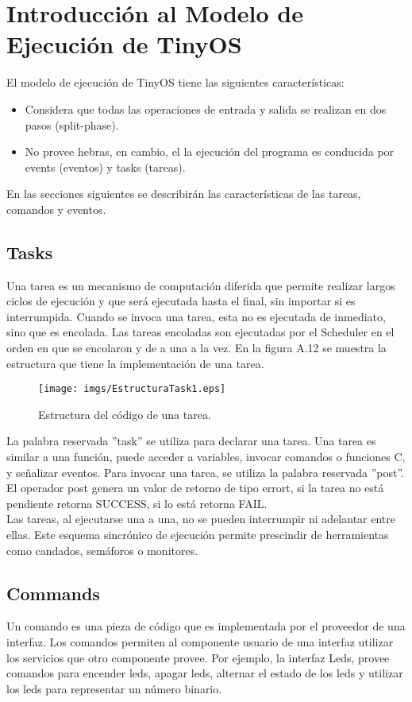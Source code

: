 \section{Introducción al Modelo de Ejecución de TinyOS}
El modelo de ejecución de TinyOS tiene las siguientes características:
\begin{itemize}
\item Considera que todas las operaciones de entrada y salida se realizan en dos pasos (split-phase).
\item No provee hebras, en cambio, el la ejecución del programa es conducida por events (eventos) y tasks  (tareas).
\end{itemize}

En las secciones siguientes se describirán las características de las tareas, comandos y eventos.

\subsection{Tasks}
Una tarea es un mecanismo de computación diferida que permite realizar largos ciclos de ejecución y que será ejecutada hasta el final, sin importar si es interrumpida. Cuando se invoca una tarea, esta no es ejecutada de inmediato, sino que es encolada. Las tareas encoladas son ejecutadas por el Scheduler en el orden en que se encolaron y de a una a la vez. En la figura A.12 se muestra la estructura que tiene la implementación de una tarea.

\begin{figure}[H]
	\centering
 	\texttt{[image: imgs/EstructuraTask1.eps]} 
 	\caption{Estructura del código de una tarea.}
\end{figure}

La palabra reservada ''task'' se utiliza para declarar una tarea. Una tarea es similar a una función, puede acceder a variables, invocar comandos o funciones C, y señalizar eventos. Para invocar una tarea, se utiliza la palabra reservada ''post''. El operador post genera un valor de retorno de tipo error\textunderscore t, si la tarea no está pendiente retorna SUCCESS, si lo está retorna FAIL.\\

Las tareas, al ejecutarse una a una, no se pueden interrumpir ni adelantar entre ellas. Este esquema sincrónico de ejecución permite prescindir de herramientas como candados, semáforos o monitores.  

\subsection{Commands}
Un comando es una pieza de código que es implementada por el proveedor de una interfaz. Los comandos permiten al componente usuario de una interfaz utilizar los servicios que otro componente provee. Por ejemplo, la interfaz Leds, provee comandos para encender leds, apagar leds, alternar el estado de los leds y utilizar los leds para representar un número binario.

